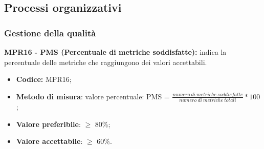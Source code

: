 \subsection{Processi organizzativi}
\subsubsection{Gestione della qualità}
\textbf{MPR16 - PMS (Percentuale di metriche soddisfatte):} indica la percentuale delle metriche che raggiungono dei valori accettabili.
\begin{itemize}
    \item \textbf{Codice:} MPR16;
    \item \textbf{Metodo di misura}: valore percentuale: PMS = $\frac{numero \ di \ metriche \ soddisfatte}{numero \ di \ metriche \ totali} * 100$ ;
    \item \textbf{Valore preferibile}: $\geq$ 80\%;
    \item \textbf{Valore accettabile}: $\geq$ 60\%.
\end{itemize}
\newpage
